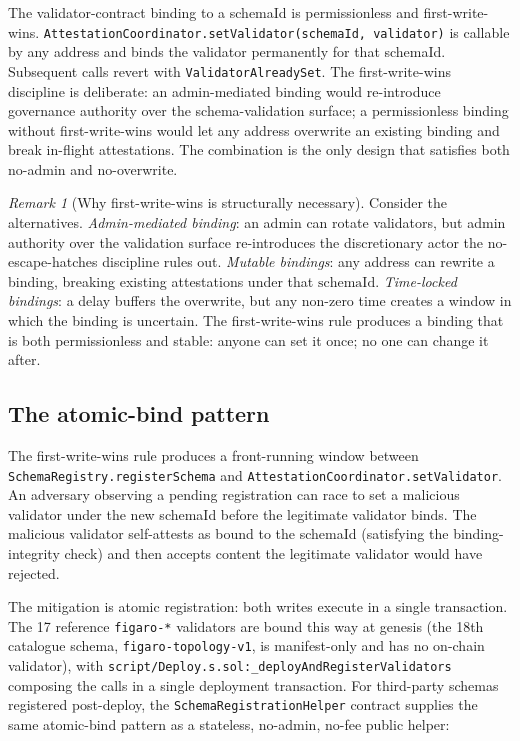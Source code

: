 \documentclass[11pt,a4paper]{article}
\theoremstyle{definition}
\theoremstyle{remark}
\newtheorem{remark}[theorem]{Remark}
\newcommand{\schemaid}{\mathrm{schemaId}}
\begin{document}
The validator-contract binding to a schemaId is permissionless and
first-write-wins. \texttt{AttestationCoordinator.setValidator(schemaId,
validator)} is callable by any address and binds the validator
permanently for that schemaId. Subsequent calls revert with
\texttt{ValidatorAlreadySet}. The first-write-wins discipline is
deliberate: an admin-mediated binding would re-introduce governance
authority over the schema-validation surface; a permissionless
binding without first-write-wins would let any address overwrite an
existing binding and break in-flight attestations. The combination
is the only design that satisfies both no-admin and
no-overwrite.

\begin{remark}[Why first-write-wins is structurally necessary]
Consider the alternatives. \emph{Admin-mediated binding}: an admin
can rotate validators, but admin authority over the validation
surface re-introduces the discretionary actor the no-escape-hatches
discipline rules out. \emph{Mutable bindings}: any address can
rewrite a binding, breaking existing attestations under that
$\schemaid$. \emph{Time-locked bindings}: a delay buffers the
overwrite, but any non-zero time creates a window in which the
binding is uncertain. The first-write-wins rule produces a binding
that is both permissionless and stable: anyone can set it once;
no one can change it after.
\end{remark}

\subsection{The atomic-bind pattern}

The first-write-wins rule produces a front-running window between
\texttt{SchemaRegistry.registerSchema} and
\texttt{AttestationCoordinator.setValidator}. An adversary observing
a pending registration can race to set a malicious validator under
the new schemaId before the legitimate validator binds. The
malicious validator self-attests as bound to the schemaId
(satisfying the binding-integrity check) and then accepts content
the legitimate validator would have rejected.

The mitigation is atomic registration: both writes execute in a
single transaction. The 17 reference \texttt{figaro-*} validators
are bound this way at genesis (the 18th catalogue schema,
\texttt{figaro-topology-v1}, is manifest-only and has no on-chain
validator), with
\texttt{script/Deploy.s.sol:\_deployAndRegisterValidators}
composing the calls in a single deployment transaction. For third-party
schemas registered post-deploy, the
\texttt{SchemaRegistrationHelper} contract supplies the same
atomic-bind pattern as a stateless, no-admin, no-fee public helper:
\end{document}
